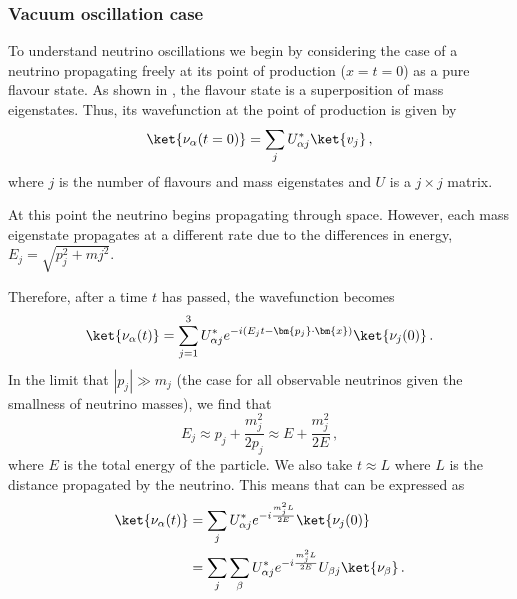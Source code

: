 \subsubsection{Vacuum oscillation case}
\label{sec:theory:theory:vacuum}
To understand neutrino oscillations we begin by considering the case of a neutrino propagating freely at its point of production ($x=t=0$) as a pure flavour state.
As shown in , the flavour state is a superposition of mass eigenstates.
Thus, its wavefunction at the point of production is given by
\begin{equation}
  \ket{\nu_{\alpha}(t=0)} = \sum_{j} U^{*}_{\alpha j} \ket{v_{j}} \, ,
\end{equation}
where $j$ is the number of flavours and mass eigenstates and $U$ is a $j \times j$ matrix.

At this point the neutrino begins propagating through space.
However, each mass eigenstate propagates at a different rate due to the differences in energy, $E_{j} = \sqrt{p_{j}^{2} + m{j}^{2}}$. 

Therefore, after a time $t$ has passed, the wavefunction becomes
\begin{equation}
  \ket{\nu_{\alpha}(t)} = \sum_{j=1}^{3} U^{*}_{\alpha j} e^{-i \left(E_{j}t - \bm{p_{j}} \cdot \bm{x} \right)} \ket{\nu_{j}(0)} \, .
  \label{eq:nuPropagation}
\end{equation}
In the limit that $|p_{j}| \gg m_{j}$ (the case for all observable neutrinos given the smallness of neutrino masses), we find that
\begin{equation}
  E_{j} \approx p_{j} + \frac{m_{j}^{2}}{2p_{j}} \approx E + \frac{m_{j}^{2}}{2E} \, ,
\end{equation}
where $E$ is the total energy of the particle.
We also take $t \approx L$ where $L$ is the distance propagated by the neutrino.
This means that  can be expressed as
\begin{align}
  \ket{\nu_{\alpha}(t)} &= \sum_{j} U^{*}_{\alpha j} e^{-i \frac{m^{2}_{j}L}{2E}} \ket{\nu_{j}(0)} \\
  &= \sum_{j} \sum_{\beta} U^{*}_{\alpha j} e^{-i \frac{m^{2}_{j}L}{2E}} U_{\beta j} \ket{\nu_{\beta}} \, .
\end{align}

